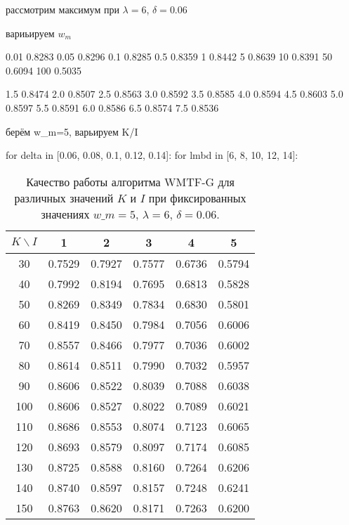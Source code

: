     рассмотрим максимум при $\lambda=6$, $\delta=0.06$

    вариьируем $w_m$

    0.01 0.8283
    0.05 0.8296
    0.1 0.8285
    0.5 0.8359
    1 0.8442
    5 0.8639
    10 0.8391
    50 0.6094
    100 0.5035

    1.5 0.8474
    2.0 0.8507
    2.5 0.8563
    3.0 0.8592
    3.5 0.8585
    4.0 0.8594
    4.5 0.8603
    5.0 0.8597
    5.5 0.8591
    6.0 0.8586
    6.5 0.8574
    7.5 0.8536

    берём w\_m=5, варьируем K/I

    \begin{table}[ht!]
        \caption{Качество работы алгоритма WMTF-G для различных значений $K$ и $I$ при фиксированных значениях $w\_m=5$, $\lambda=6$, $\delta=0.06$. \bigskip}
        \centering

            for delta in [0.06, 0.08, 0.1, 0.12, 0.14]:
                for lmbd in [6, 8, 10, 12, 14]:
        \label{tabular:wtmfg_test1}
        \begin{tabular}{|c|c|c|c|c|c|} \hline
            $K \backslash I$ & 1 & 2 & 3 & 4 & 5  \\ \hline
            30 & 0.7529 & 0.7927 & 0.7577 & 0.6736 & 0.5794  \\ \hline
            40 & 0.7992 & 0.8194 & 0.7695 & 0.6813 & 0.5828  \\ \hline
            50 & 0.8269 & 0.8349 & 0.7834 & 0.6830 & 0.5801  \\ \hline
            60 & 0.8419 & 0.8450 & 0.7984 & 0.7056 & 0.6006  \\ \hline
            70 & 0.8557 & 0.8466 & 0.7977 & 0.7036 & 0.6002  \\ \hline
            80 & 0.8614 & 0.8511 & 0.7990 & 0.7032 & 0.5957  \\ \hline
            90 & 0.8606 & 0.8522 & 0.8039 & 0.7088 & 0.6038  \\ \hline
            100 & 0.8606 & 0.8527 & 0.8022 & 0.7089 & 0.6021  \\ \hline
            110 & 0.8686 & 0.8553 & 0.8074 & 0.7123 & 0.6065  \\ \hline
            120 & 0.8693 & 0.8579 & 0.8097 & 0.7174 & 0.6085  \\ \hline
            130 & 0.8725 & 0.8588 & 0.8160 & 0.7264 & 0.6206  \\ \hline
            140 & 0.8740 & 0.8597 & 0.8157 & 0.7248 & 0.6241  \\ \hline
            150 & 0.8763 & 0.8620 & 0.8171 & 0.7263 & 0.6200  \\ \hline

        \end{tabular}
    \end{table}





